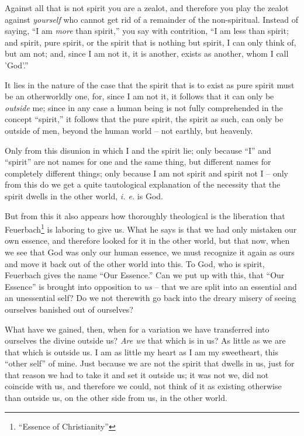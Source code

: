 \documentclass[12pt,a4paper]{book}
\begin{document}
Against all that is not spirit you are a zealot, and therefore you play the 
zealot against \textit{yourself} who cannot get rid of a remainder of the 
non-spiritual. Instead of saying, ``I am \textit{more} than spirit,'' you 
say with contrition, ``I am less than spirit; and spirit, pure spirit, or the 
spirit that is nothing but spirit, I can only think of, but am not; and, since 
I am not it, it is another, exists as another, whom I call 'God'.''

It lies in the nature of the case that the spirit that is to exist as pure 
spirit must be an otherworldly one, for, since I am not it, it follows that it 
can only be \textit{outside} me; since in any case a human being is not fully 
comprehended in the concept ``spirit,'' it follows that the pure spirit, the 
spirit as such, can only be outside of men, beyond the human world -- not 
earthly, but heavenly.

Only from this disunion in which I and the spirit lie; only because ``I'' 
and ``spirit'' are not names for one and the same thing, but different names 
for completely different things; only because I am not spirit and spirit not I 
-- only from this do we get a quite tautological explanation of the necessity 
that the spirit dwells in the other world, \textit{i. e.} is God.

But from this it also appears how thoroughly theological is the liberation 
that Feuerbach\footnote{``Essence of Christianity''} is laboring to give us. 
What he says is that we had only mistaken our own essence, and therefore 
looked for it in the other world, but that now, when we see that God was only 
our human essence, we must recognize it again as ours and move it back out of 
the other world into this. To God, who is spirit, Feuerbach gives the name 
``Our Essence.'' Can we put up with this, that ``Our Essence'' is brought 
into opposition to \textit{us} -- that we are split into an essential and an 
unessential self? Do we not therewith go back into the dreary misery of seeing 
ourselves banished out of ourselves?

What have we gained, then, when for a variation we have transferred into 
ourselves the divine outside us? \textit{Are we} that which is in us? As 
little as we are that which is outside us. I am as little my heart as I am my 
sweetheart, this ``other self'' of mine. Just because we are not the spirit 
that dwells in us, just for that reason we had to take it and set it outside 
us; it was not we, did not coincide with us, and therefore we could, not think 
of it as existing otherwise than outside us, on the other side from us, in the 
other world.
\end{document}
